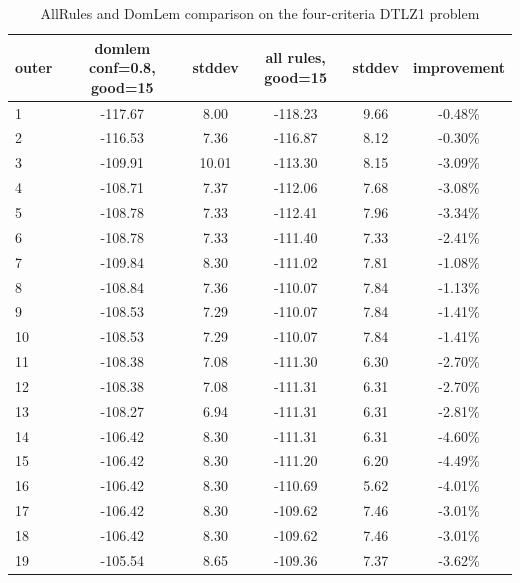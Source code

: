 \begin{table}[htb]
  \centering
  \begin{tabular}{l c c c c c}
    \hline
outer & domlem conf=0.8, good=15 & stddev & all rules, good=15 & stddev & improvement \\
    \hline
    \hline
1 & -117.67 & 8.00 & -118.23 & 9.66 & -0.48\% \\
2 & -116.53 & 7.36 & -116.87 & 8.12 & -0.30\% \\
3 & -109.91 & 10.01 & -113.30 & 8.15 & -3.09\% \\
4 & -108.71 & 7.37 & -112.06 & 7.68 & -3.08\% \\
5 & -108.78 & 7.33 & -112.41 & 7.96 & -3.34\% \\
6 & -108.78 & 7.33 & -111.40 & 7.33 & -2.41\% \\
7 & -109.84 & 8.30 & -111.02 & 7.81 & -1.08\% \\
8 & -108.84 & 7.36 & -110.07 & 7.84 & -1.13\% \\
9 & -108.53 & 7.29 & -110.07 & 7.84 & -1.41\% \\
10 & -108.53 & 7.29 & -110.07 & 7.84 & -1.41\% \\
11 & -108.38 & 7.08 & -111.30 & 6.30 & -2.70\% \\
12 & -108.38 & 7.08 & -111.31 & 6.31 & -2.70\% \\
13 & -108.27 & 6.94 & -111.31 & 6.31 & -2.81\% \\
14 & -106.42 & 8.30 & -111.31 & 6.31 & -4.60\% \\
15 & -106.42 & 8.30 & -111.20 & 6.20 & -4.49\% \\
16 & -106.42 & 8.30 & -110.69 & 5.62 & -4.01\% \\
17 & -106.42 & 8.30 & -109.62 & 7.46 & -3.01\% \\
18 & -106.42 & 8.30 & -109.62 & 7.46 & -3.01\% \\
19 & -105.54 & 8.65 & -109.36 & 7.37 & -3.62\% \\
    \hline
  \end{tabular}
  \caption{AllRules and DomLem comparison on the four-criteria DTLZ1 problem}
  \label{t:un_alldom_2c}
\end{table}



